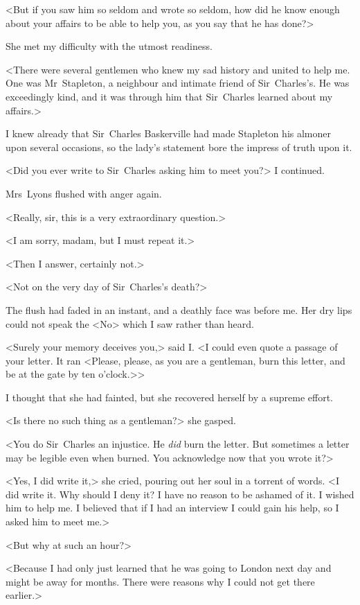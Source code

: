 <But if you saw him so seldom and wrote so seldom, how did he know enough about your affairs to be able to help you, as you say that he has done?>

She met my difficulty with the utmost readiness.

<There were several gentlemen who knew my sad history and united to help me. One was Mr~Stapleton, a neighbour and intimate friend of Sir~Charles's. He was exceedingly kind, and it was through him that Sir~Charles learned about my affairs.>

I knew already that Sir~Charles Baskerville had made Stapleton his almoner upon several occasions, so the lady's statement bore the impress of truth upon it.

<Did you ever write to Sir~Charles asking him to meet you?> I continued.

Mrs~Lyons flushed with anger again.

<Really, sir, this is a very extraordinary question.>

<I am sorry, madam, but I must repeat it.>

<Then I answer, certainly not.>

<Not on the very day of Sir~Charles's death?>

The flush had faded in an instant, and a deathly face was before me. Her dry lips could not speak the <No> which I saw rather than heard.

<Surely your memory deceives you,> said I\@. <I could even quote a passage of your letter. It ran <Please, please, as you are a gentleman, burn this letter, and be at the gate by ten o'clock.>>

I thought that she had fainted, but she recovered herself by a supreme effort.

<Is there no such thing as a gentleman?> she gasped.

<You do Sir~Charles an injustice. He \emph{did} burn the letter. But sometimes a letter may be legible even when burned. You acknowledge now that you wrote it?>

<Yes, I did write it,> she cried, pouring out her soul in a torrent of words. <I did write it. Why should I deny it? I have no reason to be ashamed of it. I wished him to help me. I believed that if I had an interview I could gain his help, so I asked him to meet me.>

<But why at such an hour?>

<Because I had only just learned that he was going to London next day and might be away for months. There were reasons why I could not get there earlier.>

